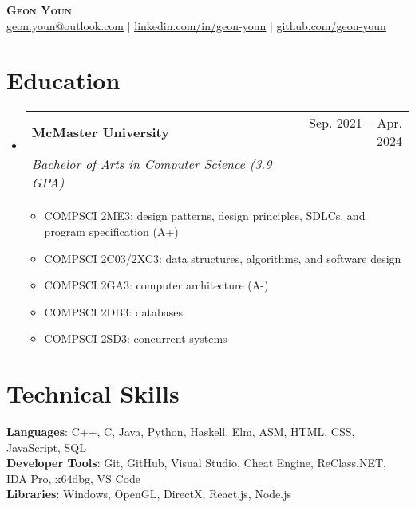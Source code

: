 \documentclass[letterpaper,11pt]{article}
\makeatletter
\newcommand{\resumeItem}[1]{
  \item\small{
    {#1 \vspace{-2pt}}
  }
}
\newcommand{\resumeSubheading}[4]{
  \vspace{-2pt}\item
    \begin{tabular*}{0.97\textwidth}[t]{l@{\extracolsep{\fill}}r}
      \textbf{#1} & #2 \\
      \textit{\small#3} & \textit{\small #4} \\
    \end{tabular*}\vspace{-7pt}
}
\newcommand{\resumeSubHeadingListStart}{\begin{itemize}[leftmargin=0.15in, label={}]}
\newcommand{\resumeSubHeadingListEnd}{\end{itemize}}
\newcommand{\resumeItemListStart}{\begin{itemize}}
\newcommand{\resumeItemListEnd}{\end{itemize}\vspace{-5pt}}
\makeatother
\begin{document}
\begin{center}
	\textbf{\Huge \scshape Geon Youn} \\ \vspace{1pt}
	\small \href{mailto:geon.youn@outlook.com}{\underline{geon.youn@outlook.com}} $|$ 
	\href{https://linkedin.com/in/geon-youn}{\underline{linkedin.com/in/geon-youn}} $|$
	\href{https://github.com/geon-youn}{\underline{github.com/geon-youn}}
\end{center}

\section{Education}
\resumeSubHeadingListStart
	\resumeSubheading
		{McMaster University}{Sep. 2021 -- Apr. 2024}
		{Bachelor of Arts in Computer Science (3.9 GPA)}{}
	\resumeItemListStart
		\resumeItem{COMPSCI 2ME3: design patterns, design principles, SDLCs, and program specification (A+)}
		\resumeItem{COMPSCI 2C03/2XC3: data structures, algorithms, and software design}
		\resumeItem{COMPSCI 2GA3: computer architecture (A-)}
		\resumeItem{COMPSCI 2DB3: databases}
		\resumeItem{COMPSCI 2SD3: concurrent systems}
	\resumeItemListEnd
\resumeSubHeadingListEnd
  
\section{Technical Skills}
\begin{itemize}[leftmargin=0.15in, label={}]
	\small{\item{
		\textbf{Languages}{: C++, C, Java, Python, Haskell, Elm, ASM, HTML, CSS, JavaScript, SQL} \\
		\textbf{Developer Tools}{: Git, GitHub, Visual Studio, Cheat Engine, ReClass.NET, IDA Pro, x64dbg, VS Code} \\
		\textbf{Libraries}{: Windows, OpenGL, DirectX, React.js, Node.js}
    }}
\end{itemize}

%
      
\end{document}
